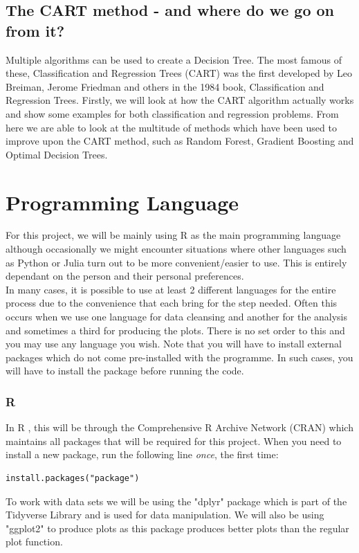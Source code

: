 \documentclass[11pt,a4paper]{report}
\begin{document}
\subsection{The CART method - and where do we go on from it?}
Multiple algorithms can be used to create a Decision Tree. 
The most famous of these, Classification and Regression Trees (CART) \cite{BreimanDT} was the first developed by Leo Breiman, Jerome Friedman and others in the 1984 book, Classification and Regression Trees.
Firstly, we will look at how the CART algorithm actually works and show some examples for both classification and regression problems. 
From here we are able to look at the multitude of methods which have been used to improve upon the CART method, such as Random Forest, Gradient Boosting and Optimal Decision Trees.


\section{Programming Language}
For this project, we will be mainly using R as the main programming language although occasionally we might encounter situations where other languages such as Python or Julia turn out to be more convenient/easier to use. This is entirely dependant on the person and their personal preferences.\\
In many cases, it is possible to use at least 2 different languages for the entire process due to the convenience that each bring for the step needed. Often this occurs when we use one
language for data cleansing and another for the analysis and sometimes a third for producing the plots. There is no set order to this and you may use any language you wish.
Note that you will have to install external packages which do not come pre-installed with the programme. In such cases, you will have to install the package before running the code.

\subsubsection{R}
In R \cite{R}, this will be through the Comprehensive R Archive Network (CRAN) which maintains all packages that will be required for this project. When you need to install a new package, run the following line \textit{once}, the first time:
\begin{lstlisting}
install.packages("package")
\end{lstlisting}
To work with data sets we will be using the "dplyr" \cite{dplyr} package which is part of the Tidyverse Library and is used for data manipulation. We will also be using "ggplot2" \cite{ggplot} to produce plots as this package produces better plots than the regular plot function.
\end{document}

